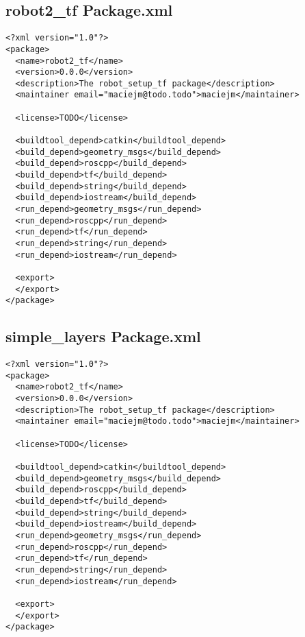 \subsection{robot2\_tf Package.xml}
\begin{lstlisting}
<?xml version="1.0"?>
<package>
  <name>robot2_tf</name>
  <version>0.0.0</version>
  <description>The robot_setup_tf package</description>
  <maintainer email="maciejm@todo.todo">maciejm</maintainer>

  <license>TODO</license>

  <buildtool_depend>catkin</buildtool_depend>
  <build_depend>geometry_msgs</build_depend>
  <build_depend>roscpp</build_depend>
  <build_depend>tf</build_depend>
  <build_depend>string</build_depend>
  <build_depend>iostream</build_depend>
  <run_depend>geometry_msgs</run_depend>
  <run_depend>roscpp</run_depend>
  <run_depend>tf</run_depend>
  <run_depend>string</run_depend>
  <run_depend>iostream</run_depend>

  <export>
  </export>
</package>
\end{lstlisting}
\subsection{simple\_layers Package.xml}
\begin{lstlisting}
<?xml version="1.0"?>
<package>
  <name>robot2_tf</name>
  <version>0.0.0</version>
  <description>The robot_setup_tf package</description>
  <maintainer email="maciejm@todo.todo">maciejm</maintainer>

  <license>TODO</license>

  <buildtool_depend>catkin</buildtool_depend>
  <build_depend>geometry_msgs</build_depend>
  <build_depend>roscpp</build_depend>
  <build_depend>tf</build_depend>
  <build_depend>string</build_depend>
  <build_depend>iostream</build_depend>
  <run_depend>geometry_msgs</run_depend>
  <run_depend>roscpp</run_depend>
  <run_depend>tf</run_depend>
  <run_depend>string</run_depend>
  <run_depend>iostream</run_depend>

  <export>
  </export>
</package>
\end{lstlisting}